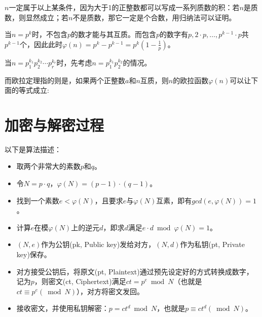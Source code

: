\documentclass[a4paper]{article}  %
\begin{document}
$n$一定属于以上某条件，因为大于1的正整数都可以写成一系列质数的积：若$n$是质数，则显然成立；若$n$不是质数，那它一定是个合数，用归纳法可以证明。

当$n = p^k$时，不包含$p$的数才能与其互质。而包含$p$的数字有$p,2\cdot p,\ldots ,p^{k-1}\cdot p$共$p^{k-1}$个，因此此时$\varphi(n) = p^k - p^{k-1} = p^k (1 - \frac{1}{p} )$。

当$n = p_{1}^{k_1}p_{2}^{k_2}\cdots p_{r}^{k_r}$时，先考虑$n = p_{1}^{k_1}p_{2}^{k_2}$的情况。

而欧拉定理指的则是，如果两个正整数$a$和$n$互质，则$n$的欧拉函数$\varphi(n)$可以让下面的等式成立:
\section[算法描述]{加密与解密过程}

以下是算法描述：
\begin{itemize}
    \item 取两个非常大的素数$p$和$q$。
    \item 令$N = p \cdot q$，$\varphi(N) = (p - 1) \cdot (q - 1)$。
    \item 找到一个素数$e < \varphi(N)$，且要求$e$与$\varphi(N)$互素，即有$gcd(e, \varphi(N)) = 1$。 %
    \item 计算$e$在模$\varphi(N)$上的逆元$d$，即求$d$满足$e \cdot d \bmod \varphi(N) = 1$。
    \item $(N, e)$作为公钥(pk, Public key)发给对方，$(N, d)$作为私钥(pt, Private key)保存。
    \item 对方接受公钥后，将原文(pt, Plaintext)通过预先设定好的方式转换成数字，记为$p$，则密文(ct, Ciphertext)满足$ct = p ^ e \bmod N$（也就是$ct \equiv p ^ e (\bmod N)$），对方将密文发回。
    \item 接收密文，并使用私钥解密：$p = ct ^ d \bmod N$，也就是$p \equiv ct ^ d (\bmod N)$。
\end{itemize} 

\end{document}
